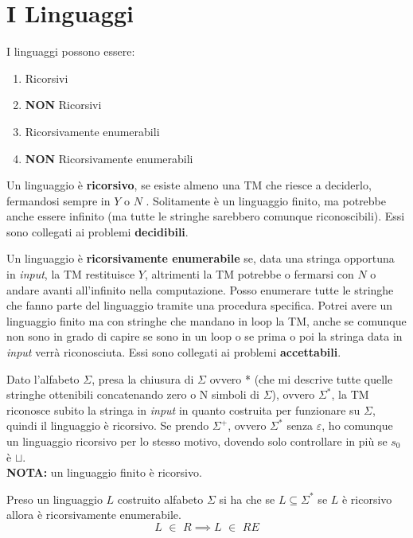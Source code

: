 \section{I Linguaggi}
I linguaggi possono essere:
\begin{enumerate}
    \item Ricorsivi
    \item \textbf{NON} Ricorsivi
    \item Ricorsivamente enumerabili
    \item \textbf{NON} Ricorsivamente enumerabili
\end{enumerate} 
\begin{definizione}
  Un linguaggio è \textbf{ricorsivo}, se esiste
  almeno una TM che riesce a deciderlo, fermandosi sempre in $Y$ o
  $N$ . Solitamente è un linguaggio finito, ma potrebbe anche essere infinito (ma
  tutte le stringhe sarebbero comunque riconoscibili). Essi sono collegati ai problemi \textbf{decidibili}.
\end{definizione}
 \begin{definizione}
   Un linguaggio è \textbf{ricorsivamente enumerabile} se, data una stringa opportuna in
  \textit{input}, la TM restituisce $Y$, altrimenti la TM potrebbe o fermarsi con $N$ o andare
  avanti all'infinito nella computazione. Posso enumerare tutte le stringhe che
  fanno parte del linguaggio tramite una procedura specifica. Potrei avere
  un linguaggio finito ma con 
  stringhe che mandano in loop la TM, anche se comunque non sono in grado di
  capire se sono in un loop o se prima o poi la stringa data in \textit{input} verrà
  riconosciuta. Essi sono collegati ai problemi \textbf{accettabili}.
 \end{definizione}
Dato l'alfabeto $\Sigma$, presa la chiusura
di $\Sigma$ ovvero * (che mi descrive tutte quelle stringhe ottenibili concatenando zero o N simboli di $\Sigma$), ovvero $\Sigma^*$,
la TM riconosce subito la stringa in \textit{input} in quanto costruita per funzionare
su $\Sigma$, quindi il linguaggio è ricorsivo. Se prendo $\Sigma^+$, ovvero
$\Sigma^*$ senza $\varepsilon$, ho comunque un linguaggio ricorsivo per lo
stesso motivo, dovendo solo controllare in più se $s_0$ è $\sqcup$.\\
 \textbf{NOTA:} un linguaggio finito è ricorsivo.\\
\begin{definizione}
  Preso un linguaggio $L$ costruito alfabeto $\Sigma$ si ha che
  se $L\subseteq\Sigma^*$ se $L$ è ricorsivo allora è ricorsivamente
  enumerabile.
\[L\,\,\in\,\,R \implies L\,\,\in\,\,RE\]
\end{definizione}
